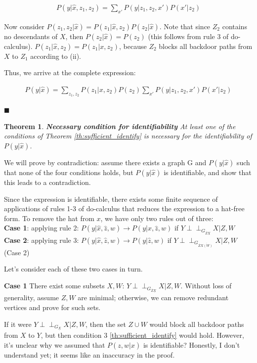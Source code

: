 \documentclass[fleqn]{article}
\newcommand{\independent}{\perp \!\!\! \perp}
\newtheorem{theorem}{Theorem}
\numberwithin{equation}{section}
\numberwithin{theorem}{section}
\numberwithin{figure}{section}
\numberwithin{lemma}{section}
\numberwithin{corollary}{section}
\begin{document}
\begin{align}
	P(y|\hat x, z_1, z_2) = \sum\limits_{x'} P(y|z_1, z_2, x')P(x'|z_2)
\end{align}
	
	
Now consider $P(z_1, z_2 | \hat x) = P(z_1 | \hat x, z_2) P(z_2 | \hat x)$. Note that since $Z_2$ contains no descendants of $X$, then $P(z_2|\hat x) = P(z_2)$ (this follows from rule 3 of do-calculus). $P(z_1 | \hat x, z_2) = P(z_1 | x, z_2)$, because $Z_2$ blocks all backdoor paths from $X$ to $Z_1$ according to (ii).

Thus, we arrive at the complete expression:

\begin{align}
	P(y|\hat x) = \sum\limits_{z_1,z_2}P(z_1|x, z_2)P(z_2)\sum\limits_{x'} P(y|z_1, z_2, x')P(x'|z_2)
\end{align}

$\blacksquare$

\begin{theorem}
	\textbf{Necessary condition for identifiability} At least one of the conditions of Theorem \ref{th:sufficient_identify} is necessary for the identifiability of $P(y|\hat x)$. 
\end{theorem}

We will prove by contradiction: assume there exists a graph G and $P(y|\hat x)$ such that none of the four conditions holds, but $P(y|\hat x)$ is identifiable, and show that this leads to a contradiction.

Since the expression is identifiable, there exists some finite sequence of applications of rules 1-3 of do-calculus that reduces the expression to a hat-free form. To remove the hat from $x$, we have only two rules out of three:\\
\textbf{Case 1}: applying rule 2: $P(y|\hat x, \hat z, w) \to P(y|x, \hat z, w)$ if $Y \independent_{G_{\overline Z \underline{X}}} X | Z, W$ \\
\textbf{Case 2}: applying rule 3: $P(y|\hat x, \hat z, w) \to P(y|\hat z, w)$ if $Y \independent_{G_{\overline{Z}\overline{X(W)}}} X | Z, W$ (Case 2)

Let's consider each of these two cases in turn.

\textbf{Case 1}
There exist some subsets $X,W$: $Y \independent_{G_{\overline Z \underline{X}}} X | Z, W$. Without loss of generality, assume $Z, W$ are minimal; otherwise, we can remove redundant vertices and prove for such sets.

If it were $Y \independent_{G_{\underline{X}}} X | Z, W$, then the set $Z \cup W$ would block all backdoor paths from $X$ to $Y$, but then condition 3 \ref{th:sufficient_identify} would hold. However, it's unclear why we assumed that $P(z,w | \hat x)$ is identifiable? Honestly, I don't understand yet; it seems like an inaccuracy in the proof.
\end{document}
